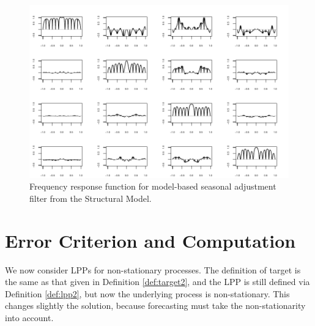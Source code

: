 \documentclass[a4paper]{book}
\begin{document}
\begin{figure}[htb!]
\begin{center}
\includegraphics[]{sauc_frf.pdf}
\caption{Frequency response function for model-based seasonal adjustment
  filter from the Structural Model.}
\label{fig:sauc-frf}
\end{center}
\end{figure} 



\section{Error Criterion and Computation}
\label{sec:mdfa-nonstat}

We now consider LPPs for non-stationary processes. 
 The definition of target is the same as that given in Definition \ref{def:target2},
 and the LPP is still defined via Definition \ref{def:lpp2},
 but now the underlying process is non-stationary.  This changes
  slightly the solution, because forecasting must take the non-stationarity
  into account.
 
\end{document}
